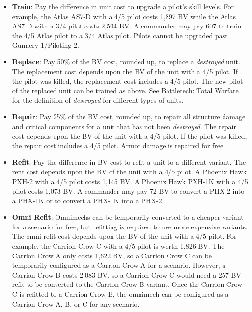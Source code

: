 \documentclass[UTF8]{article}
\begin{document}
\begin{itemize}

\item {\bf Train}: Pay the difference in unit cost to upgrade a pilot's skill levels.
For example, the Atlas AS7-D with a 4/5 pilot costs 1,897 BV while the Atlas AS7-D with a 3/4 pilot costs 2,504 BV.
A commander may pay 607 to train the 4/5 Atlas pilot to a 3/4 Atlas pilot.
Pilots cannot be upgraded past Gunnery 1/Piloting 2.

\item {\bf Replace}: Pay 50\% of the BV cost, rounded up, to replace a \emph{destroyed} unit.
The replacement cost depends upon the BV of the unit with a 4/5 pilot.
If the pilot was killed, the replacement cost includes a 4/5 pilot.
The new pilot of the replaced unit can be trained as above.
See Battletech: Total Warfare for the definition of \emph{destroyed} for different types of units.

\item {\bf Repair}: Pay 25\% of the BV cost, rounded up, to repair all structure damage and critical components for a unit that has not been \emph{destroyed}.
The repair cost depends upon the BV of the unit with a 4/5 pilot.
If the pilot was killed, the repair cost includes a 4/5 pilot.
Armor damage is repaired for free.

\item {\bf Refit}: Pay the difference in BV cost to refit a unit to a different variant.
The refit cost depends upon the BV of the unit with a 4/5 pilot.
A Phoenix Hawk PXH-2 with a 4/5 pilot costs 1,145 BV.
A Phoenix Hawk PXH-1K with a 4/5 pilot costs 1,073 BV.
A commander may pay 72 BV to convert a PHX-2 into a PHX-1K or to convert a PHX-1K into a PHX-2.

\item {\bf Omni Refit}: Omnimechs can be temporarily converted to a cheaper variant for a scenario for free, but refitting is required to use more expensive variants.
The omni refit cost depends upon the BV of the unit with a 4/5 pilot.
For example, the Carrion Crow C with a 4/5 pilot is worth 1,826 BV.
The Carrion Crow A only costs 1,622 BV, so a Carrion Crow C can be temporarily configured as a Carrion Crow A for a scenario.
However, a Carrion Crow B costs 2,083 BV, so a Carrion Crow C would need a 257 BV refit to be converted to the Carrion Crow B variant.
Once the Carrion Crow C is refitted to a Carrion Crow B, the omnimech can be configured as a Carrion Crow A, B, or C for any scenario.


\end{itemize}
\end{document}
